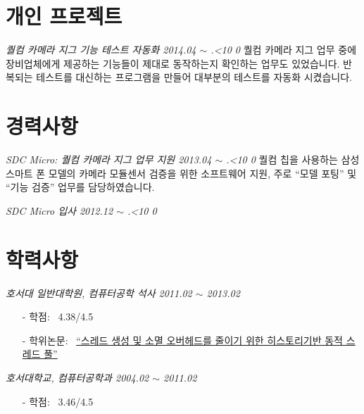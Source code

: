 \documentclass[line,margin]{res}
\renewcommand{\today}{\number\year.\ifnum\number\month<10 0\fi \number\month}
\begin{document}
\begin{resume}
  \section{개인 프로젝트}

  {\sl 퀄컴 카메라 지그 기능 테스트 자동화 \hfill 2014.04 $\sim$ \today}
  \vspace{1mm}
  \newline
  {
    \small
    퀄컴 카메라 지그 업무 중에 장비업체에게 제공하는 기능들이 제대로 동작하는지 확인하는 업무도 있었습니다.
    반복되는 테스트를 대신하는 프로그램을 만들어 대부분의 테스트를 자동화 시켰습니다.
  }


  \section{경력사항}

  {\sl SDC Micro: 퀄컴 카메라 지그 업무 지원 \hfill 2013.04 $\sim$ \today}
  \vspace{1mm}
  \newline
  {
    \small
    퀄컴 칩을 사용하는 삼성 스마트 폰 모델의 카메라 모듈센서 검증을 위한 소프트웨어 지원,
    주로 ``모델 포팅'' 및 ``기능 검증'' 업무를 담당하였습니다.
  }

  {\sl SDC Micro 입사 \hfill 2012.12 $\sim$ \today}
  \vspace{0mm}


  \section{학력사항}

  {\sl 호서대 일반대학원, 컴퓨터공학 석사 \hfill 2011.02 $\sim$ 2013.02}
  \vspace{-4mm}
  {
    \small
    \begin{itemize}
    \item[-] 학점: ~4.38/4.5 \vspace{-1mm}
    \item[-] 학위논문: ~\href{http://dlibrary.hoseo.ac.kr/search/DetailView.ax?sid=4&cid=950591}
      {``스레드 생성 및 소멸 오버헤드를 줄이기 위한 히스토리기반 동적 스레드 풀''}
    \end{itemize}
  }

  {\sl 호서대학교, 컴퓨터공학과 \hfill 2004.02 $\sim$ 2011.02}
  \vspace{-4mm}
  {
    \small
    \begin{itemize}
    \item[-] 학점: ~3.46/4.5
    \end{itemize}
  }



\end{resume}
\end{document}
